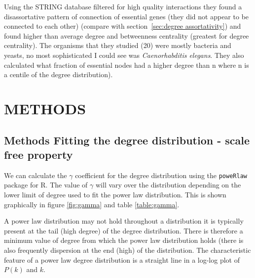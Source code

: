  Using the STRING database filtered for high quality interactions they found a disassortative  pattern of connection of essential genes (they did not appear to be connected to each other)  (compare with section~\ref{sec:degree assortativity})  and found higher than average degree and betweenness centrality (greatest for degree centrality). The organisms that they studied (20) were mostly bacteria and yeasts, no most sophisticated I could see was \textit{Caenorhabditis elegans}. They also calculated what fraction of essential nodes had a higher degree than n where n is a centile of the degree distribution).








\section{METHODS}

\subsection{Methods Fitting the degree distribution - scale free property}

We can calculate the $\gamma$ coefficient for the degree distribution using the \texttt{poweRlaw} package for R. The value of $\gamma$ will vary over the distribution depending on the lower limit of degree used to fit the power law distribution. This is shown graphically in figure \ref{fig:gamma} and table \ref{table:gamma}.

A power law distribution may not hold throughout a distribution it is typically present at the tail (high degree) of the degree distribution. There is therefore a minimum value of degree from which the power law distribution holds (there is also frequently dispersion at the end (high) of the distribution. The characteristic feature of a power law degree distribution is a straight line in a log-log plot of $ P(k)$ and $k$.

